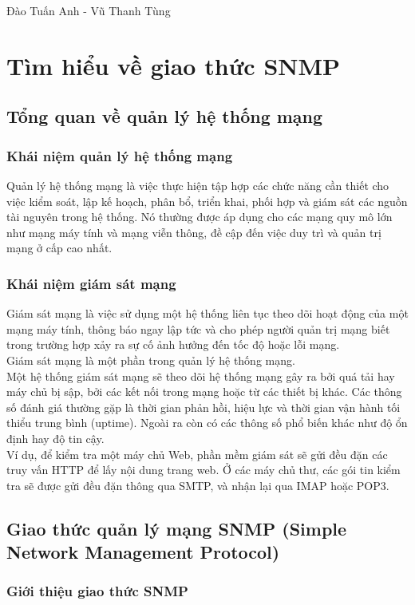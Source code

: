 \documentclass[12pt,oneside,a4paper]{article}
\begin{document}
Đào Tuấn Anh - Vũ Thanh Tùng
\newpage

\section{Tìm hiểu về giao thức SNMP}
\subsection{Tổng quan về quản lý hệ thống mạng}
\subsubsection{Khái niệm quản lý hệ thống mạng}
Quản lý hệ thống mạng là việc thực hiện tập hợp các chức năng cần thiết cho việc kiểm soát, lập kế hoạch, phân bổ, triển khai, phối hợp và giám sát các nguồn tài nguyên trong hệ thống. Nó thường được áp dụng cho các mạng quy mô lớn như mạng máy tính và mạng viễn thông, đề cập đến việc duy trì và quản trị mạng ở cấp cao nhất.
\subsubsection{Khái niệm giám sát mạng}
Giám sát mạng là việc sử dụng một hệ thống liên tục theo dõi hoạt động của một mạng máy tính, thông báo ngay lập tức và cho phép người quản trị mạng biết trong trường hợp xảy ra sự cố ảnh hưởng đến tốc độ hoặc lỗi mạng.\\

Giám sát mạng là một phần trong quản lý hệ thống mạng.\\

Một hệ thống giám sát mạng sẽ theo dõi hệ thống mạng gây ra bởi quá tải hay máy chủ bị sập, bởi các kết nối trong mạng hoặc từ các thiết bị khác. Các thông số đánh giá thường gặp là thời gian phản hồi, hiệu lực và thời gian vận hành tối thiểu trung bình (uptime). Ngoài ra còn có các thông số phổ biến khác như độ ổn định hay độ tin cậy.\\

Ví dụ, để kiểm tra một máy chủ Web, phần mềm giám sát sẽ gửi đều đặn các truy vấn HTTP để lấy nội dung trang web. Ở các máy chủ thư, các gói tin kiểm tra sẽ được gửi đều đặn thông qua SMTP, và nhận lại qua IMAP hoặc POP3.
\subsection{Giao thức quản lý mạng SNMP (Simple Network Management Protocol)}
\subsubsection{Giới thiệu giao thức SNMP}
\end{document}
